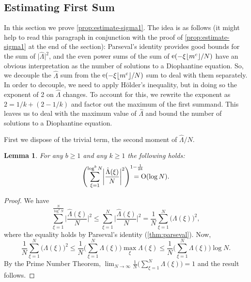 \documentclass[letterpaper, 12pt]{article}
\theoremstyle{plain}
\newtheorem{Lemma}[Theorem]{Lemma}
\theoremstyle{definition}
\theoremstyle{plain}
\theoremstyle{plain}
\numberwithin{equation}{section}
\newcommand{\Oh}{{\rm O}}
\renewcommand{\leq}{\leqslant}
\renewcommand{\geq}{\geqslant}
\newcommand{\1}{\textbf{1}}
\DeclarePairedDelimiter\floor{\lfloor}{\rfloor}
\DeclareMathOperator{\e}{e}
\begin{document}
\subsection{Estimating First Sum}
In this section we prove \cref{prop:estimate-sigma1}. The idea is as follows (it might help to read this paragraph in conjunction with the proof of \cref{prop:estimate-sigma1} at the end of the section): Parseval's identity provides good bounds for the sum of $\lvert \hat{\Lambda} \rvert^2$, and the even power sums of the sum of  $\e(-\xi \floor{m^c}/N)$ have an obvious interpretation as the number of solutions to a Diophantine equation. So, we decouple the $\hat{\Lambda}$ sum from the $\e(-\xi \floor{m^c}/N)$ sum to deal with them separately. In order to decouple, we need to apply H\"{o}lder's inequality, but in doing so the exponent of 2 on $\hat{\Lambda}$ changes. To account for this, we rewrite the exponent as $2 = 1/k + (2 - 1/k)$ and factor out the maximum of the first summand. This leaves us to deal with the maximum value of $\hat{\Lambda}$ and bound the number of solutions to a Diophantine equation.

First we dispose of the trivial term, the second moment of $\hat{\Lambda}/N$.
\begin{Lemma}\label{lem:parseval-bound}
    For any $b \geq 1$ and any $k \geq 1$ the following holds:
    \[
        \Biggl(\sum_{\xi = 1}^{\log^b N} \biggl\lvert \frac{\hat{\Lambda}(\xi)}{N} \biggr\rvert^{2} \Biggr)^{1-\frac{1}{2k}} \mkern-32mu = \Oh(\log N).
    \]
\end{Lemma}
\begin{proof}
    We have
    \begin{equation*}
        \sum_{\xi = 1}^{\frac{N}{\log^b N}} \biggl\lvert \frac{\hat{\Lambda}(\xi)}{N} \biggr\rvert^{2}
        \leq \sum_{\xi = 1}^{N} \biggl\lvert \frac{\hat{\Lambda}(\xi)}{N} \biggr\rvert^{2}
        \! = \frac{1}{N}\sum_{\xi = 1}^{N} \bigl(\Lambda(\xi)\bigr)^2,
    \end{equation*}
    where the equality holds by Parseval's identity (\cref{thm:parseval}). Now,
    \begin{equation*}
        \frac{1}{N} \sum_{\xi = 1}^{N} \bigl(\Lambda(\xi)\bigr)^2
        \leq \frac{1}{N} \biggl(\sum_{\xi = 1}^{N} \Lambda(\xi) \biggr) \max_{\xi} \Lambda(\xi)
        \leq \frac{1}{N} \biggl(\sum_{\xi = 1}^{N} \Lambda(\xi) \biggr) \log N.
    \end{equation*}
   By the Prime Number Theorem, $\displaystyle \lim_{N \to \infty} \frac{1}{N} \biggl(\sum_{\xi = 1}^{N} \Lambda(\xi) \biggr) = 1$ and the result follows.
\end{proof}
\end{document}
